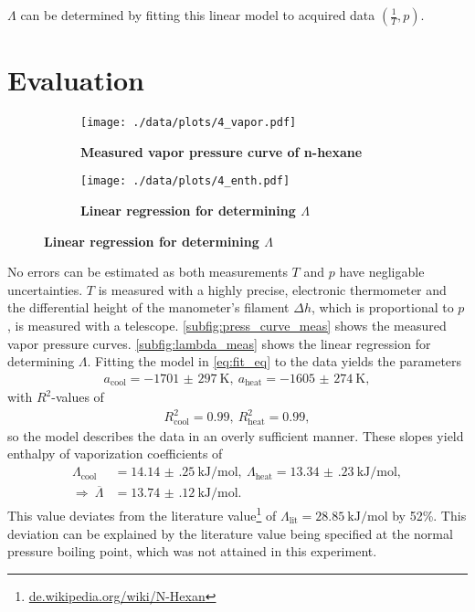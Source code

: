 $\Lambda$ can be determined by fitting this linear model to acquired data $(\frac{1}{T},p)$.

\section{Evaluation}
\begin{figure}[tbp]
	\centering
	\begin{subfigure}{0.4\textwidth}
		\centering
		\texttt{[image: ./data/plots/4\_vapor.pdf]}
		\caption{\textbf{Measured vapor pressure curve of n-hexane}}
		\label{subfig:press_curve_meas}
	\end{subfigure}
	\begin{subfigure}{0.4\textwidth}
		\centering
		\texttt{[image: ./data/plots/4\_enth.pdf]}
		\caption{\textbf{Linear regression for determining $\Lambda$}}
		\label{subfig:lambda_meas}
	\end{subfigure}
\end{figure}

No errors can be estimated as both measurements $T$ and $p$ have negligable uncertainties.
$T$ is measured with a highly precise, electronic thermometer and the differential height of the manometer's filament $\Delta h$, which is proportional to $p$, is measured with a telescope.
\autoref{subfig:press_curve_meas} shows the measured vapor pressure curves.
\autoref{subfig:lambda_meas} shows the linear regression for determining $\Lambda$.
Fitting the model in \autoref{eq:fit_eq} to the data yields the parameters
\begin{align*}
	a_\text{cool}=\SI{-1701(297)}{\kelvin},\ a_\text{heat}=\SI{-1605(274)}{\kelvin},
\end{align*}
with $R^2$-values of
\begin{align*}
	R^2_\text{cool}=\num{0.99},\ R^2_\text{heat}=\num{0.99},
\end{align*}
so the model describes the data in an overly sufficient manner.
These slopes yield enthalpy of vaporization coefficients of
\begin{align*}
	\Lambda_\text{cool}&=\SI{14.14(25)}{\kilo\joule\per\mole},\ \Lambda_\text{heat}=\SI{13.34(23)}{\kilo\joule\per\mole}, \\
	\Rightarrow\ \overline{\Lambda}&=\SI{13.74(12)}{\kilo\joule\per\mole}.
\end{align*}
This value deviates from the literature value\footnote{\url{de.wikipedia.org/wiki/N-Hexan}} of $\Lambda_\text{lit}=\SI{28.85}{\kilo\joule\per\mole}$ by \num{52}\%.
This deviation can be explained by the literature value being specified at the normal pressure boiling point, which was not attained in this experiment.
